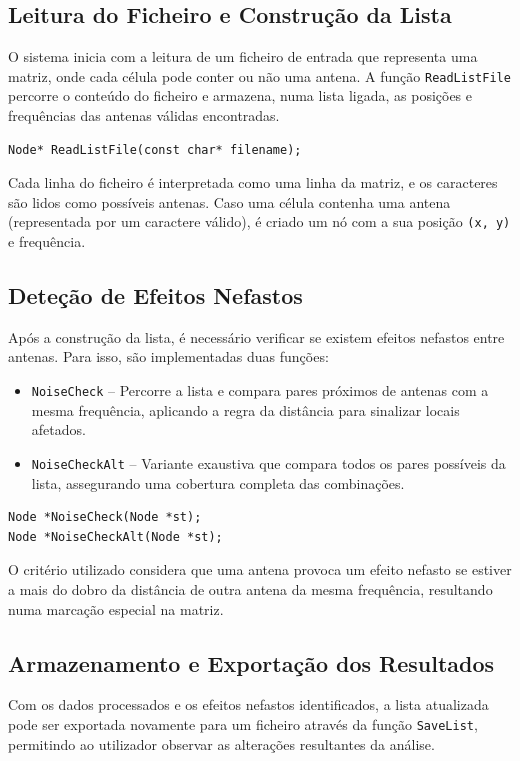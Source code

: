 \documentclass[a4paper,12pt]{article}
\begin{document}
\subsection{Leitura do Ficheiro e Construção da Lista}
O sistema inicia com a leitura de um ficheiro de entrada que representa uma matriz, onde cada célula pode conter ou não uma antena. A função \texttt{ReadListFile} percorre o conteúdo do ficheiro e armazena, numa lista ligada, as posições e frequências das antenas válidas encontradas.

\begin{lstlisting}[style=CStyle]
Node* ReadListFile(const char* filename);
\end{lstlisting}

Cada linha do ficheiro é interpretada como uma linha da matriz, e os caracteres são lidos como possíveis antenas. Caso uma célula contenha uma antena (representada por um caractere válido), é criado um nó com a sua posição \texttt{(x, y)} e frequência.

\subsection{Deteção de Efeitos Nefastos}
Após a construção da lista, é necessário verificar se existem efeitos nefastos entre antenas. Para isso, são implementadas duas funções:

\begin{itemize}
    \item \texttt{NoiseCheck} – Percorre a lista e compara pares próximos de antenas com a mesma frequência, aplicando a regra da distância para sinalizar locais afetados.
    \item \texttt{NoiseCheckAlt} – Variante exaustiva que compara todos os pares possíveis da lista, assegurando uma cobertura completa das combinações.
\end{itemize}

\begin{lstlisting}[style=CStyle]
Node *NoiseCheck(Node *st);
Node *NoiseCheckAlt(Node *st);
\end{lstlisting}

O critério utilizado considera que uma antena provoca um efeito nefasto se estiver a mais do dobro da distância de outra antena da mesma frequência, resultando numa marcação especial na matriz.

\subsection{Armazenamento e Exportação dos Resultados}
Com os dados processados e os efeitos nefastos identificados, a lista atualizada pode ser exportada novamente para um ficheiro através da função \texttt{SaveList}, permitindo ao utilizador observar as alterações resultantes da análise.
\end{document}
